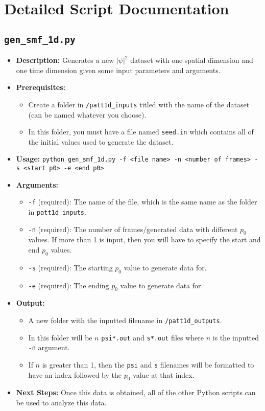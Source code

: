 \documentclass{article}
\begin{document}
\newpage

\section{Detailed Script Documentation}

\subsection{\texttt{gen\_smf\_1d.py}}
\begin{itemize}
    \item \textbf{Description:} Generates a new \(\lvert \psi \rvert^2\) dataset with one spatial dimension and one time dimension given some input parameters and arguments.
    \item \textbf{Prerequisites:} 
    \begin{itemize}
        \item Create a folder in \texttt{/patt1d\_inputs} titled with the name of the dataset (can be named whatever you choose).
        \item In this folder, you must have a file named \texttt{seed.in} which contains all of the initial values used to generate the dataset.
    \end{itemize}
    \item \textbf{Usage:} \texttt{python gen\_smf\_1d.py -f <file name> -n <number of frames> -s <start p0> -e <end p0>}
    \item \textbf{Arguments:}
    \begin{itemize}
        \item \texttt{-f} (required): The name of the file, which is the same name as the folder in \texttt{patt1d\_inputs}.
        \item \texttt{-n} (required): The number of frames/generated data with different \(p_0\) values. If more than 1 is input, then you will have to specify the start and end \(p_0\) values.
        \item \texttt{-s} (required): The starting \(p_0\) value to generate data for.
        \item \texttt{-e} (required): The ending \(p_0\) value to generate data for.
    \end{itemize}
    \item \textbf{Output:} 
    \begin{itemize}
        \item A new folder with the inputted filename in \texttt{/patt1d\_outputs}.
        \item In this folder will be \(n\) \texttt{psi*.out} and \texttt{s*.out} files where \(n\) is the inputted \texttt{-n} argument.
        \item If \(n\) is greater than 1, then the \texttt{psi} and \texttt{s} filenames will be formatted to have an index followed by the \(p_0\) value at that index.
    \end{itemize}
    \item \textbf{Next Steps:} Once this data is obtained, all of the other Python scripts can be used to analyze this data.
\end{itemize}
\end{document}
